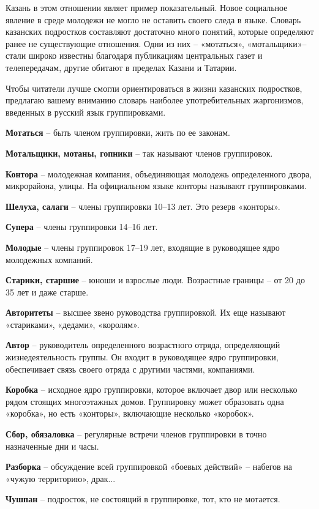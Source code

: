 \documentclass[12pt, a4paper, openany]{book}
\begin{document}
Казань в этом отношении являет пример показательный. Новое социальное явление в среде молодежи не могло не оставить своего следа в языке. Словарь казанских подростков составляют достаточно много понятий, которые определяют ранее не существующие отношения. Одни из них – «мотаться», «мотальщики»– стали широко известны благодаря публикациям центральных газет и телепередачам, другие обитают в пределах Казани и Татарии.

Чтобы читатели лучше смогли ориентироваться в жизни казанских подростков, предлагаю вашему вниманию словарь наиболее употребительных жаргонизмов, введенных в русский язык группировками.

\textbf{Мотаться} – быть членом группировки, жить по ее законам.

\textbf{Мотальщики, мотаны, гопники} – так называют членов группировок.

\textbf{Контора} – молодежная компания, объединяющая молодежь определенного двора, микрорайона, улицы. На официальном языке конторы называют группировками.

\textbf{Шелуха, салаги} – члены группировки 10–13 лет. Это резерв «конторы».

\textbf{Супера} – члены группировки 14–16 лет.

\textbf{Молодые} – члены группировок 17–19 лет, входящие в руководящее ядро молодежных компаний.

\textbf{Старики, старшие} – юноши и взрослые люди. Возрастные границы – от 20 до 35 лет и даже старше.

\textbf{Авторитеты} – высшее звено руководства группировкой. Их еще называют «стариками», «дедами», «королям».

\textbf{Автор} – руководитель определенного возрастного отряда, определяющий жизнедеятельность группы. Он входит в руководящее ядро группировки, обеспечивает связь своего отряда с другими частями, компаниями.

\textbf{Коробка} – исходное ядро группировки, которое включает двор или несколько рядом стоящих многоэтажных домов. Группировку может образовать одна «коробка», но есть «конторы», включающие несколько «коробок».

\textbf{Сбор, обязаловка} – регулярные встречи членов группировки в точно назначенные дни и часы.

\textbf{Разборка} – обсуждение всей группировкой «боевых действий» – набегов на «чужую территорию», драк...

\textbf{Чушпан} – подросток, не состоящий в группировке, тот, кто не мотается.
\end{document}
